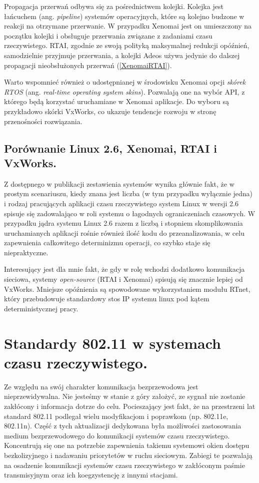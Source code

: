 Propagacja przerwań odbywa się za pośrednictwem kolejki. Kolejka jest łańcuchem (ang. \emph{pipeline}) systemów operacyjnych, które są kolejno budzone w reakcji na otrzymane przerwanie. W przypadku Xenomai jest on umieszczony na początku kolejki i obsługuje przerwania związane z zadaniami czasu rzeczywistego. RTAI, zgodnie ze swoją polityką maksymalnej redukcji opóźnień, samodzielnie przyjmuje przerwania, a kolejki Adeos używa jedynie do dalszej propagacji nieobsłużonych przerwań (\ref{XenomaiRTAI}). 

Warto wspomnieć również o udostępnianej w środowisku Xenomai opcji \emph{skórek RTOS} (ang. \emph{real-time operating system skins}). Pozwalają one na wybór API, z którego będą korzystać uruchamiane w Xenomai aplikacje. Do wyboru są przykładowo skórki VxWorks, co ukazuje tendencje rozwoju w stronę przenośności rozwiązania.

\subsection{Porównanie Linux 2.6, Xenomai, RTAI i VxWorks.}

Z dostępnego w publikacji \cite{pub:Comparison} zestawienia systemów wynika głównie fakt, że w prostym scenariuszu, kiedy znana jest liczba (w tym przypadku wyłącznie jedna) i rodzaj pracujących aplikacji czasu rzeczywistego system Linux w wersji 2.6 spisuje się zadowalająco w roli systemu o łagodnych ograniczeniach czasowych. W przypadku jądra systemu Linux 2.6 razem z liczbą i stopniem skomplikowania uruchamianych aplikacji rośnie również ilość kodu do przeanalizowania, w celu zapewnienia całkowitego determinizmu operacji, co szybko staje się niepraktyczne.

Interesujący jest dla mnie fakt, że gdy w rolę wchodzi dodatkowo komunikacja sieciowa, systemy \emph{open-source} (RTAI i Xenomai) spisują się znacznie lepiej od VxWorks. Mniejsze opóźnienia są spowodowane wykorzystaniem modułu RTnet, który przebudowuje standardowy stos IP systemu linux pod kątem deterministycznej pracy.


\section{Standardy 802.11 w systemach czasu rzeczywistego.}

Ze względu na swój charakter komunikacja bezprzewodowa jest nieprzewidywalna. Nie jesteśmy w stanie z góry założyć, ze sygnał nie zostanie zakłócony i informacja dotrze do celu. Pocieszający jest fakt, że na przestrzeni lat standard 802.11 podlegał wielu modyfikacjom i poprawkom (np. 802.11e, 802.11n). Część z tych aktualizacji dedykowana była możliwości zastosowania medium bezprzewodowego do komunikacji systemów czasu rzeczywistego. Koncentrują się one na potrzebie zapewnienia takiemu systemowi okien dostępu bezkolizyjnego i nadawaniu priorytetów w ruchu sieciowym. Zabiegi te pozwalają na osadzenie komunikacji systemów czasu rzeczywistego w zakłóconym paśmie transmisyjnym oraz ich koegzystencję z innymi stacjami. 

